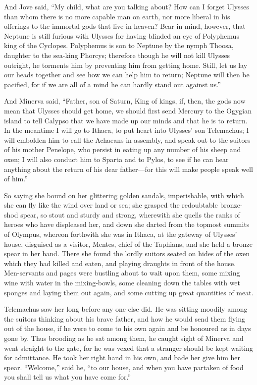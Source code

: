 And Jove said, “My child, what are you talking about? How can I forget Ulysses
than whom there is no more capable man on earth, nor more liberal in his
offerings to the immortal gods that live in heaven? Bear in mind, however, that
Neptune is still furious with Ulysses for having blinded an eye of Polyphemus
king of the Cyclopes. Polyphemus is son to Neptune by the nymph Thoosa,
daughter to the sea-king Phorcys; therefore though he will not kill Ulysses
outright, he torments him by preventing him from getting home. Still, let us
lay our heads together and see how we can help him to return; Neptune will then
be pacified, for if we are all of a mind he can hardly stand out against us.”

And Minerva said, “Father, son of Saturn, King of kings, if, then, the gods now
mean that Ulysses should get home, we should first send Mercury to the Ogygian
island to tell Calypso that we have made up our minds and that he is to return.
In the meantime I will go to Ithaca, to put heart into Ulysses’ son Telemachus;
I will embolden him to call the Achaeans in assembly, and speak out to the
suitors of his mother Penelope, who persist in eating up any number of his
sheep and oxen; I will also conduct him to Sparta and to Pylos, to see if he
can hear anything about the return of his dear father—for this will make people
speak well of him.”

So saying she bound on her glittering golden sandals, imperishable, with which
she can fly like the wind over land or sea; she grasped the redoubtable
bronze-shod spear, so stout and sturdy and strong, wherewith she quells the
ranks of heroes who have displeased her, and down she darted from the topmost
summits of Olympus, whereon forthwith she was in Ithaca, at the gateway of
Ulysses’ house, disguised as a visitor, Mentes, chief of the Taphians, and she
held a bronze spear in her hand. There she found the lordly suitors seated on
hides of the oxen which they had killed and eaten, and playing draughts in
front of the house. Men-servants and pages were bustling about to wait upon
them, some mixing wine with water in the mixing-bowls, some cleaning down the
tables with wet sponges and laying them out again, and some cutting up great
quantities of meat.

Telemachus saw her long before any one else did. He was sitting moodily among
the suitors thinking about his brave father, and how he would send them flying
out of the house, if he were to come to his own again and be honoured as in
days gone by. Thus brooding as he sat among them, he caught sight of Minerva
and went straight to the gate, for he was vexed that a stranger should be kept
waiting for admittance. He took her right hand in his own, and bade her give
him her spear. “Welcome,” said he, “to our house, and when you have partaken of
food you shall tell us what you have come for.”

